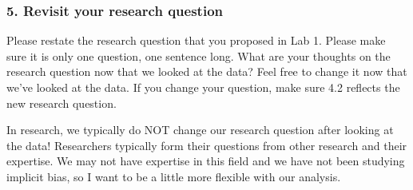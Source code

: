 \documentclass[
  letterpaper,
  DIV=11,
  numbers=noendperiod]{scrartcl}
\begin{document}
\hypertarget{revisit-your-research-question}{%
\subsubsection{5. Revisit your research
question}\label{revisit-your-research-question}}

\begin{tcolorbox}[enhanced jigsaw, colframe=quarto-callout-important-color-frame, arc=.35mm, colbacktitle=quarto-callout-important-color!10!white, bottomrule=.15mm, left=2mm, breakable, opacitybacktitle=0.6, rightrule=.15mm, opacityback=0, bottomtitle=1mm, coltitle=black, leftrule=.75mm, toptitle=1mm, titlerule=0mm, title=\textcolor{quarto-callout-important-color}{\faExclamation}\hspace{0.5em}{Task}, toprule=.15mm, colback=white]

Please restate the research question that you proposed in Lab 1. Please
make sure it is only one question, one sentence long. What are your
thoughts on the research question now that we looked at the data? Feel
free to change it now that we've looked at the data. If you change your
question, make sure 4.2 reflects the new research question.

\end{tcolorbox}

\begin{tcolorbox}[enhanced jigsaw, colframe=quarto-callout-note-color-frame, arc=.35mm, colbacktitle=quarto-callout-note-color!10!white, bottomrule=.15mm, left=2mm, breakable, opacitybacktitle=0.6, rightrule=.15mm, opacityback=0, bottomtitle=1mm, coltitle=black, leftrule=.75mm, toptitle=1mm, titlerule=0mm, title=\textcolor{quarto-callout-note-color}{\faInfo}\hspace{0.5em}{Note}, toprule=.15mm, colback=white]

In research, we typically do NOT change our research question after
looking at the data! Researchers typically form their questions from
other research and their expertise. We may not have expertise in this
field and we have not been studying implicit bias, so I want to be a
little more flexible with our analysis.

\end{tcolorbox}
\end{document}
